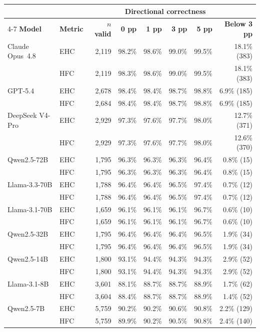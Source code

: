\begin{tabular}{llrrrrrr}
\toprule
& & & \multicolumn{4}{c}{Directional correctness} & \\
\cmidrule(lr){4-7}
\textbf{Model} & \textbf{Metric} & \textbf{$n$ valid} &
\textbf{0 pp} & \textbf{1 pp} & \textbf{3 pp} & \textbf{5 pp} &
\textbf{Below 3 pp} \\
\midrule
Claude Opus~4.8 & EHC & 2,119 & 98.2\% & 98.6\% & 99.0\% & 99.5\% & 18.1\% (383) \\
 & HFC & 2,119 & 98.3\% & 98.6\% & 99.0\% & 99.5\% & 18.1\% (383) \\
GPT-5.4 & EHC & 2,678 & 98.4\% & 98.4\% & 98.7\% & 98.8\% & 6.9\% (185) \\
 & HFC & 2,684 & 98.4\% & 98.4\% & 98.7\% & 98.8\% & 6.9\% (185) \\
DeepSeek V4-Pro & EHC & 2,929 & 97.3\% & 97.6\% & 97.7\% & 98.0\% & 12.7\% (371) \\
 & HFC & 2,929 & 97.3\% & 97.6\% & 97.7\% & 98.0\% & 12.6\% (370) \\
\midrule
Qwen2.5-72B & EHC & 1,795 & 96.3\% & 96.3\% & 96.3\% & 96.4\% & 0.8\% (15) \\
 & HFC & 1,795 & 96.3\% & 96.3\% & 96.3\% & 96.4\% & 0.8\% (15) \\
Llama-3.3-70B & EHC & 1,788 & 96.4\% & 96.4\% & 96.5\% & 97.4\% & 0.7\% (12) \\
 & HFC & 1,788 & 96.4\% & 96.4\% & 96.5\% & 97.4\% & 0.7\% (12) \\
Llama-3.1-70B & EHC & 1,659 & 96.1\% & 96.1\% & 96.1\% & 96.7\% & 0.6\% (10) \\
 & HFC & 1,659 & 96.1\% & 96.1\% & 96.1\% & 96.7\% & 0.6\% (10) \\
Qwen2.5-32B & EHC & 1,795 & 96.4\% & 96.4\% & 96.4\% & 96.5\% & 1.9\% (34) \\
 & HFC & 1,795 & 96.4\% & 96.4\% & 96.4\% & 96.5\% & 1.9\% (34) \\
Qwen2.5-14B & EHC & 1,800 & 93.1\% & 94.4\% & 94.3\% & 94.3\% & 2.9\% (52) \\
 & HFC & 1,800 & 93.1\% & 94.4\% & 94.3\% & 94.3\% & 2.9\% (52) \\
Llama-3.1-8B & EHC & 3,601 & 88.1\% & 88.7\% & 88.7\% & 88.9\% & 1.7\% (62) \\
 & HFC & 3,604 & 88.4\% & 88.7\% & 88.7\% & 88.9\% & 1.4\% (52) \\
Qwen2.5-7B & EHC & 5,759 & 90.2\% & 90.2\% & 90.6\% & 90.8\% & 2.2\% (129) \\
 & HFC & 5,759 & 89.9\% & 90.2\% & 90.5\% & 90.8\% & 2.4\% (140) \\
\bottomrule
\end{tabular}
